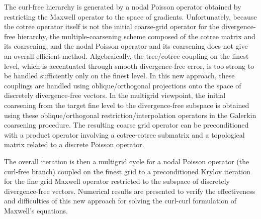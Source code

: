 \documentclass{report}
\begin{document}
The
curl-free hierarchy is generated by a nodal Poisson operator
obtained by restricting the Maxwell operator to the space of
gradients. Unfortunately, because the cotree operator itself
is not the initial coarse-grid operator for the
divergence-free hierarchy, the multiple-coarsening scheme
composed of the cotree matrix and its coarsening, and the
nodal Poisson operator and its coarsening does not give an
overall efficient method. Algebraically, the tree/cotree
coupling on the finest level, which is accentuated through
smooth divergence-free error, is too strong to be handled
sufficiently only on the finest level. In this new approach,
these couplings are handled using oblique/orthogonal
projections onto the space of discretely divergence-free
vectors. In the multigrid viewpoint, the initial coarsening
from the target fine level to the divergence-free subspace
is obtained using these oblique/orthogonal
restriction/interpolation operators in the Galerkin
coarsening procedure. The resulting coarse grid operator can
be preconditioned with a product operator involving a
cotree-cotree submatrix and a topological matrix related to
a discrete Poisson operator.

The overall iteration is then a
multigrid cycle for a nodal Poisson operator (the curl-free
branch) coupled on the finest grid to a preconditioned
Krylov iteration for the fine grid Maxwell operator
restricted to the subspace of discretely divergence-free
vectors. Numerical results are presented to verify the
effectiveness and difficulties of this new approach for
solving the curl-curl formulation of Maxwell's equations.



\end{document}
